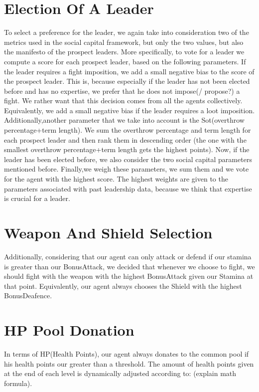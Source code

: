 \section{Election Of A Leader}

To select a preference for the leader, we again take into consideration two of the metrics used in the social capital framework, but only the two values, but also the manifesto of the prospect leaders. More specifically, to vote for a leader we compute a score for each prospect leader, based on the following parameters. If the leader requires a fight imposition, we add a small negative bias to the score of the prospect leader. This is, because especially if the leader has not been elected before and has no expertise, we prefer that he does not impose(/ propose?) a fight. We rather want that this decision comes from all the agents collectively. Equivalently, we add a small negative bias if the leader requires a loot imposition. Additionally,another parameter that we take into account is the Sot(overthrow percentage+term length). We sum the overthrow percentage and term length for each prospect leader and then rank them in descending order (the one with the smallest overthrow percentage+term length gets the highest points). Now, if the leader has been elected before, we also consider the two social capital parameters mentioned before. Finally,we weigh these parameters, we sum them and we vote for the agent with the highest score. The highest weights are given to the parameters associated with past leadership data, because we think that expertise is crucial for a leader.

\section{Weapon And Shield Selection}

Additionally, considering that our agent can only attack or defend if our stamina is greater than our BonusAttack, we decided that whenever we choose to fight, we should fight with the weapon with the highest BonusAttack given our Stamina at that point. Equivalently, our agent always chooses the Shield with the highest BonusDeafence.

\section{HP Pool Donation}

In terms of HP(Health Points), our agent always donates to the common pool if his health points our greater than a threshold. The amount of health points given at the end of each level is dynamically adjusted according to: (explain math formula).

